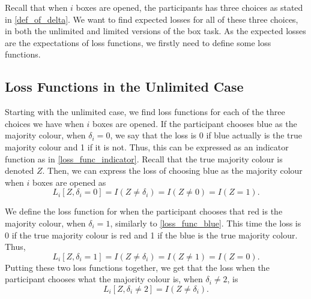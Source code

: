 Recall that when $i$ boxes are opened, the participants has three choices as stated in \eqref{def_of_delta}. We want to find expected losses for all of these three choices, in both the unlimited and limited versions of the box task. As the expected losses are the expectations of loss functions, we firstly need to define some loss functions. 



\subsection{Loss Functions in the Unlimited Case}
Starting with the unlimited case, we find loss functions for each of the three choices we have when $i$ boxes are opened. If the participant chooses blue as the majority colour, when $\delta_i=0$, we say that the loss is 0 if blue actually is the true majority colour and 1 if it is not. Thus, this can be expressed as an indicator function as in \eqref{loss_func_indicator}. Recall that the true majority colour is denoted $Z$. Then, we can express the loss of choosing blue as the majority colour when $i$ boxes are opened as
\begin{equation}
\label{loss_func_blue}
    L_i[Z,\delta_i=0] = I(Z \neq \delta_i) = I(Z\neq0) = I(Z=1).
\end{equation}

We define the loss function for when the participant chooses that red is the majority colour, when $\delta_i=1$, similarly to \eqref{loss_func_blue}. This time the loss is 0 if the true majority colour is red and 1 if the blue is the true majority colour. Thus,
\begin{equation}
\label{loss_func_red}
    L_i[Z,\delta_i=1] = I(Z\neq\delta_i) = I(Z\neq1)=I(Z=0).
\end{equation}
Putting these two loss functions together, we get that the loss when the participant chooses what the majority colour is, when $\delta_i \neq 2$, is 
\begin{equation}
\label{loss_0_1_unlim}
    L_i[Z,\delta_i \neq 2] = I(Z \neq \delta_i). 
\end{equation}

